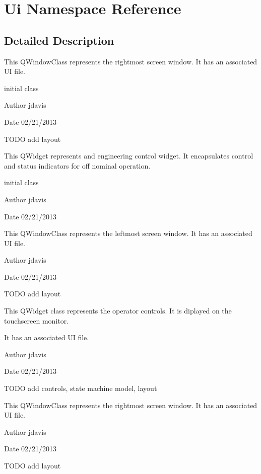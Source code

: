 \hypertarget{namespaceUi}{\section{Ui Namespace Reference}
\label{namespaceUi}
}


\subsection{Detailed Description}
This Q\-Window\-Class represents the rightmost screen window. It has an associated U\-I file.

initial class \begin{DoxyAuthor}{Author}
jdavis 
\end{DoxyAuthor}
\begin{DoxyDate}{Date}
02/21/2013
\end{DoxyDate}
T\-O\-D\-O add layout

This Q\-Widget represents and engineering control widget. It encapsulates control and status indicators for off nominal operation.

initial class \begin{DoxyAuthor}{Author}
jdavis 
\end{DoxyAuthor}
\begin{DoxyDate}{Date}
02/21/2013
\end{DoxyDate}
This Q\-Window\-Class represents the leftmost screen window. It has an associated U\-I file.

\begin{DoxyAuthor}{Author}
jdavis 
\end{DoxyAuthor}
\begin{DoxyDate}{Date}
02/21/2013
\end{DoxyDate}
T\-O\-D\-O add layout

This Q\-Widget class represents the operator controls. It is diplayed on the touchscreen monitor.

It has an associated U\-I file.

\begin{DoxyAuthor}{Author}
jdavis 
\end{DoxyAuthor}
\begin{DoxyDate}{Date}
02/21/2013
\end{DoxyDate}
T\-O\-D\-O add controls, state machine model, layout

This Q\-Window\-Class represents the rightmost screen window. It has an associated U\-I file.

\begin{DoxyAuthor}{Author}
jdavis 
\end{DoxyAuthor}
\begin{DoxyDate}{Date}
02/21/2013
\end{DoxyDate}
T\-O\-D\-O add layout 